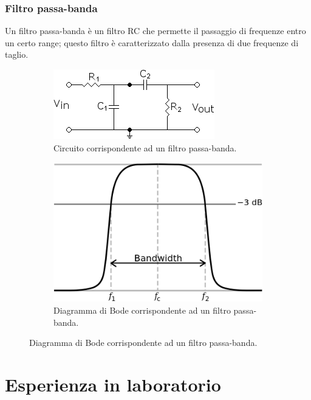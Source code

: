 \documentclass[a4paper]{article}
\begin{document}
			\subsubsection{Filtro passa-banda}
				Un filtro passa-banda è un filtro RC che permette il passaggio di frequenze entro un certo range; questo filtro è caratterizzato dalla presenza di due frequenze di taglio.
				\begin{figure}[h!]
					\centering
					\begin{subfigure}{0.4\textwidth}
						\centering
						\includegraphics[scale=0.6]{filtroPassaBanda}
						\caption{Circuito corrispondente ad un filtro passa-banda.}
					\end{subfigure}
					\begin{subfigure}{0.4\textwidth}
						\centering
						\includegraphics[scale=0.3]{filtroPassaBandaBode}
						\caption{Diagramma di Bode corrispondente ad un filtro passa-banda.}
					\end{subfigure}
					\label{fig:filtroPassaBanda}
				\end{figure}
	\section{Esperienza in laboratorio}
\end{document}
